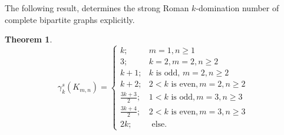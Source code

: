 \documentclass[12pt]{amsart}
\newtheorem{theorem}{Theorem}[section]
\begin{document}
The following result, determines the strong Roman $k$-domination number of complete bipartite graphs explicitly.
\begin{theorem}\label{thm2}
$$\gamma_k^s(K_{m,n})=\left\lbrace \begin{array}{ll}
k; & m=1, n\geq 1 \\ 
3; & k=2, m=2, n\geq 2 \\
k+1; &  k \textrm{ is odd, } m=2, n\geq 2 \\
k+2; & 2<k \textrm{ is even}, m=2, n\geq 2 \\
\frac{3k+3}{2}; & 1<k \textrm{ is odd}, m=3, n\geq 3 \\  
\frac{3k+4}{2}; & 2<k \textrm{ is even}, m=3, n\geq 3 \\
2k; & \textrm{ else.}
\end{array} \right.$$
\end{theorem}
\end{document}
